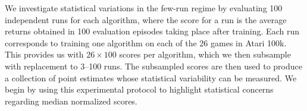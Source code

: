 We investigate statistical variations in the few-run regime by evaluating 100 independent runs for each algorithm,
where the score for a run is the average returns obtained in 100 evaluation episodes taking place after training. 
Each run corresponds to training one algorithm on each of the 26 games in Atari 100k. This provides us with $26 \times 100$ scores per algorithm, which we then subsample with replacement to 3--100 runs. The subsampled scores are then used to produce a collection of point estimates whose statistical variability can be measured. We begin by using this experimental protocol to highlight statistical concerns regarding median normalized scores.



